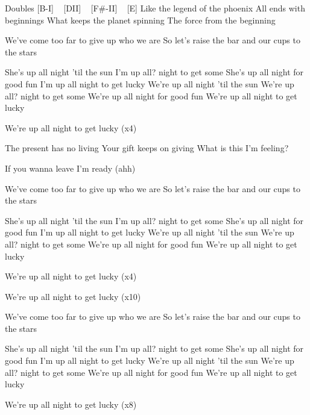 Doubles
[B-I] ~ [DII] ~ [F#-II] ~ [E]
 Like the legend of the phoenix
All ends with beginnings
What keeps the planet spinning
The force from the beginning


We've come too far to give up who we are
So let's raise the bar and our cups to the stars

She's up all night 'til the sun
I'm up all? night to get some
She's up all night for good fun
I'm up all night to get lucky
We're up all night 'til the sun
We're up all? night to get some
We're up all night for good fun
We're up all night to get lucky


We're up all night to get lucky (x4)

The present has no living
Your gift keeps on giving
What is this I'm feeling?

If you wanna leave I'm ready (ahh)

We've come too far to give up who we are
So let's raise the bar and our cups to the stars

She's up all night 'til the sun
I'm up all? night to get some
She's up all night for good fun
I'm up all night to get lucky
We're up all night 'til the sun
We're up all? night to get some
We're up all night for good fun
We're up all night to get lucky

We're up all night to get lucky (x4)

We're up all night to get lucky (x10)


We've come too far to give up who we are
So let's raise the bar and our cups to the stars

She's up all night 'til the sun
I'm up all? night to get some
She's up all night for good fun
I'm up all night to get lucky
We're up all night 'til the sun
We're up all? night to get some
We're up all night for good fun
We're up all night to get lucky

We're up all night to get lucky (x8) 